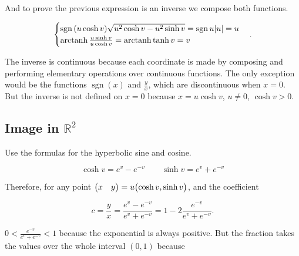 \documentclass[
    12pt, %
]{fphw}
\DeclareMathOperator{\sgn}{sgn}
\DeclareMathOperator{\arctanh}{arctanh}
\newcommand{\R}{\mathbb{R}}
\begin{document}
\noindent
And to prove the previous expression
is an inverse we compose both functions\footnotemark.


\begin{equation*}
    \begin{cases}
        \sgn{(u\cosh v)} \sqrt{u^2\cosh v - u^2\sinh v} =
        \sgn u\abs{u} =
        u \\
        \arctanh{\frac{u\sinh v}{u\cosh v}} =
        \arctanh{\tanh v} =
        v
    \end{cases}.
\end{equation*}

\noindent
The inverse is continuous because each coordinate is made by
composing and performing elementary operations over continuous functions.
The only exception would be the functions $\sgn(x)$ and $\frac{y}{x}$,
which are discontinuous when $x = 0$.
But the inverse is not defined on $x = 0$ because $x = u\cosh v$,
$u \neq 0$, $\cosh v > 0$.

\subsection*{Image in $\R^2$}

    Use the formulas for the hyperbolic sine and cosine.

\begin{equation*}
    \cosh v = e^v - e^{-v} \qquad \sinh v = e^v + e^{-v}
\end{equation*}

    Therefore, for any point $\mqty(x & y) = u\mqty(\cosh v, \sinh v)$,
and the coefficient

\begin{equation*}
    c = \frac{y}{x} = \frac{e^v-e^{-v}}{e^v+e^{-v}} = 1 - 2\frac{e^{-v}}{e^v+e^{-v}}.
\end{equation*}

\noindent
$0 < \frac{e^{-v}}{e^v+e^{-v}} < 1$ because the exponential is always positive.
But the fraction takes the values over the whole interval $(0, 1)$ because
\end{document}
